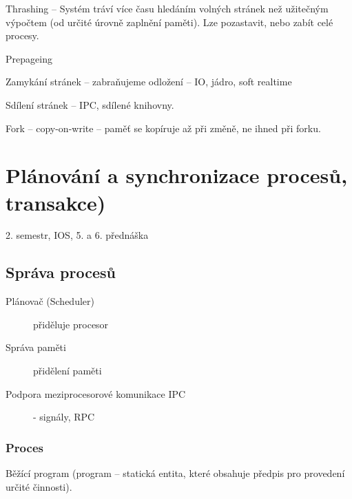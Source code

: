 \documentclass[a4paper, 11pt]{report}
\begin{document}
Thrashing -- Systém tráví více času hledáním volných stránek než užitečným výpočtem (od určité úrovně zaplnění paměti). Lze pozastavit, nebo zabít celé procesy.

Prepageing

Zamykání stránek -- zabraňujeme odložení -- IO, jádro, soft realtime

Sdílení stránek -- IPC, sdílené knihovny.

Fork -- copy-on-write -- paměť se kopíruje až při změně, ne ihned při forku.

























\chapter{Plánování a synchronizace procesů, transakce)} \label{cha:35}

2. semestr, IOS, 5. a 6. přednáška

\section{Správa procesů}

\begin{description}
	\item[Plánovač (Scheduler)]přiděluje procesor
	\item[Správa paměti] přidělení paměti
	\item[Podpora meziprocesorové komunikace IPC] - signály, RPC
\end{description}

\subsection{Proces}
Běžící program (program -- statická entita, které obsahuje předpis pro provedení určité činnosti).
\end{document}
